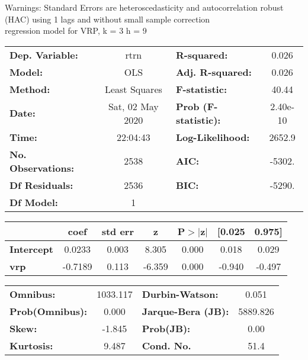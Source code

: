 Warnings: \newline
 [1] Standard Errors are heteroscedasticity and autocorrelation robust (HAC) using 1 lags and without small sample correction\\ 

regression model for VRP, k = 3 h = 9\begin{center}
\begin{tabular}{lclc}
\toprule
\textbf{Dep. Variable:}    &       rtrn       & \textbf{  R-squared:         } &     0.026   \\
\textbf{Model:}            &       OLS        & \textbf{  Adj. R-squared:    } &     0.026   \\
\textbf{Method:}           &  Least Squares   & \textbf{  F-statistic:       } &     40.44   \\
\textbf{Date:}             & Sat, 02 May 2020 & \textbf{  Prob (F-statistic):} &  2.40e-10   \\
\textbf{Time:}             &     22:04:43     & \textbf{  Log-Likelihood:    } &    2652.9   \\
\textbf{No. Observations:} &        2538      & \textbf{  AIC:               } &    -5302.   \\
\textbf{Df Residuals:}     &        2536      & \textbf{  BIC:               } &    -5290.   \\
\textbf{Df Model:}         &           1      & \textbf{                     } &             \\
\bottomrule
\end{tabular}
\begin{tabular}{lcccccc}
                   & \textbf{coef} & \textbf{std err} & \textbf{z} & \textbf{P$> |$z$|$} & \textbf{[0.025} & \textbf{0.975]}  \\
\midrule
\textbf{Intercept} &       0.0233  &        0.003     &     8.305  &         0.000        &        0.018    &        0.029     \\
\textbf{vrp}       &      -0.7189  &        0.113     &    -6.359  &         0.000        &       -0.940    &       -0.497     \\
\bottomrule
\end{tabular}
\begin{tabular}{lclc}
\textbf{Omnibus:}       & 1033.117 & \textbf{  Durbin-Watson:     } &    0.051  \\
\textbf{Prob(Omnibus):} &   0.000  & \textbf{  Jarque-Bera (JB):  } & 5889.826  \\
\textbf{Skew:}          &  -1.845  & \textbf{  Prob(JB):          } &     0.00  \\
\textbf{Kurtosis:}      &   9.487  & \textbf{  Cond. No.          } &     51.4  \\
\bottomrule
\end{tabular}
\end{center}

